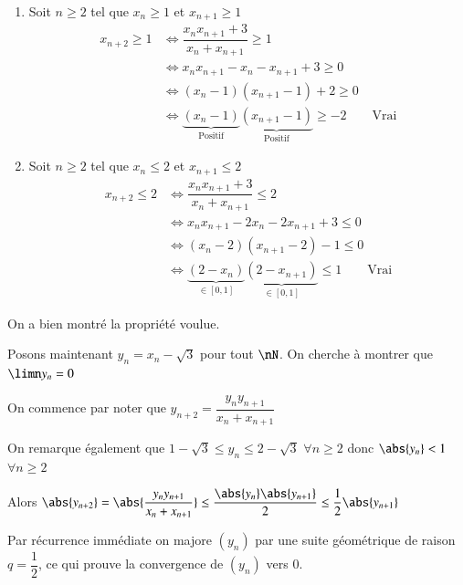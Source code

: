 \documentclass[oneside,12pt]{article}          %
\begin{document}
\begin{enumerate}
	\item[i)] Soit $n\geq2$ tel que $x_n \geq 1$ et $x_{n+1} \geq 1$
	\begin{align*}
		x_{n+2} \geq 1 & \iff  \dfrac{x_n x_{n+1} +3}{x_n + x_{n+1}} \geq 1 \\
		& \iff  x_n x_{n+1} -x_n - x_{n+1} + 3 \geq 0 \\
		& \iff  (x_n - 1)(x_{n+1} - 1) + 2 \geq 0 \\
		& \iff \underbrace{(x_n - 1)}_{\text{Positif}}\underbrace{(x_{n+1} - 1)}_{\text{Positif}} \geq -2 \qquad \text{Vrai}
	\end{align*}
	
	\item[ii)] Soit $n\geq2$ tel que $x_n \leq 2$ et $x_{n+1} \leq 2$
		\begin{align*}
		x_{n+2} \leq 2 & \iff  \dfrac{x_n x_{n+1} +3}{x_n + x_{n+1}} \leq 2 \\
		& \iff x_n x_{n+1} - 2x_n - 2x_{n+1} + 3 \leq 0 \\
		& \iff (x_n - 2)(x_{n+1} - 2) - 1 \leq 0 \\
		& \iff \underbrace{(2 - x_n)}_{\in[0,1]} \underbrace{(2 - x_{n+1})}_{\in[0,1]} \leq 1 \qquad \text{Vrai}
	\end{align*}
\end{enumerate}

On a bien montré la propriété voulue.

Posons maintenant $y_n = x_n - \sqrt{3}$ pour tout $\nN$. On cherche à montrer que $\limn y_n = 0$

On commence par noter que $y_{n+2} = \dfrac{y_n y_{n+1}}{x_n + x_{n+1}}$

On remarque également que $1 - \sqrt{3} \leq y_n \leq 2 - \sqrt{3}$ \quad $\forall n\geq2$ \quad donc $\abs{y_n} < 1$ \quad $\forall n \geq 2$

Alors $\abs{y_{n+2}} = \abs{\dfrac{y_n y_{n+1}}{x_n + x_{n+1}}} \leq \dfrac{\abs{y_n} \abs{y_{n+1}}}{2}
\leq \dfrac{1}{2} \abs{y_{n+1}}$

Par récurrence immédiate on majore $(y_n)$ par une suite géométrique de raison $q = \dfrac{1}{2}$, ce qui prouve la convergence de $(y_n)$ vers $0$.
\end{document}
